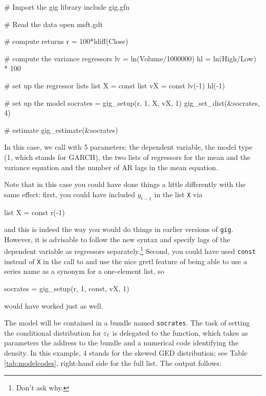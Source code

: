 \documentclass[a4paper,11pt]{article}
\newcommand{\dtk}[1]{\texttt{\detokenize{#1}}}
\newcommand{\stdu}{\ensuremath \varepsilon}
\newcommand{\gig}{\texttt{gig}}
\begin{document}
\begin{code}
# Import the gig library
include gig.gfn

# Read the data
open msft.gdt

# compute returns
r = 100*ldiff(Close)

# compute the variance regressors
lv = ln(Volume/1000000)
hl = ln(High/Low) * 100

# set up the regressor lists
list X = const
list vX = const lv(-1) hl(-1)

# set up the model
socrates = gig_setup(r, 1, X, vX, 1)
gig_set_dist(&socrates, 4)

# estimate
gig_estimate(&socrates)
\end{code}

In this case, we call \dtk{gig_setup} with 5 parameters: the
dependent variable, the model type (1, which stands for GARCH), the
two lists of regressors for the mean and the variance equation and the
number of AR lags in the mean equation.

Note that in this case you could have done things a little differently
with the same effect: first, you could have included $y_{t-1}$ in the
list \texttt{X} via
\begin{code}
  list X = const r(-1)
\end{code}
and this is indeed the way you would do things in earlier versions of
\gig. However, it is advisable to follow the new syntax and specify
lags of the dependent variable as regressors separately.\footnote{Don't
  ask why.} Second, you could have used \texttt{const} instead of
\texttt{X} in the call to \dtk{gig_setup} and use the nice gretl
feature of being able to use a series name as a synonym for a
one-element list, so
\begin{code}
  socrates = gig_setup(r, 1, const, vX, 1)
\end{code}
would have worked just as well.

The model will be contained in a bundle named \texttt{socrates}. The
task of setting the conditional distribution for $\stdu_t$ is
delegated to the \dtk{gig_set_dist} function, which takes as
parameters the address to the bundle and a numerical code identifying
the density. In this example, 4 stands for the skewed GED
distribution; see Table \ref{tab:modelcodes}, right-hand side for the
full list. The output follows:
\end{document}
